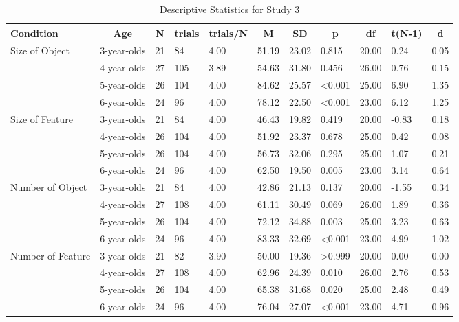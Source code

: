 \documentclass[
  man]{apa6}
\begin{document}
\begin{table}[tbp]

\begin{center}
\begin{threeparttable}

\caption{\label{tab:s3_testtables}Descriptive Statistics for Study 3}

\scriptsize{

\begin{tabular}{lllllllllll}
\toprule
Condition & \multicolumn{1}{c}{Age} & \multicolumn{1}{c}{N} & \multicolumn{1}{c}{trials} & \multicolumn{1}{c}{trials/N} & \multicolumn{1}{c}{M} & \multicolumn{1}{c}{SD} & \multicolumn{1}{c}{p} & \multicolumn{1}{c}{df} & \multicolumn{1}{c}{t(N-1)} & \multicolumn{1}{c}{d}\\
\midrule
Size of Object & 3-year-olds & 21 & 84 & 4.00 & 51.19 & 23.02 & 0.815 & 20.00 & 0.24 & 0.05\\
 & 4-year-olds & 27 & 105 & 3.89 & 54.63 & 31.80 & 0.456 & 26.00 & 0.76 & 0.15\\
 & 5-year-olds & 26 & 104 & 4.00 & 84.62 & 25.57 & <0.001 & 25.00 & 6.90 & 1.35\\
 & 6-year-olds & 24 & 96 & 4.00 & 78.12 & 22.50 & <0.001 & 23.00 & 6.12 & 1.25\\
Size of Feature & 3-year-olds & 21 & 84 & 4.00 & 46.43 & 19.82 & 0.419 & 20.00 & -0.83 & 0.18\\
 & 4-year-olds & 26 & 104 & 4.00 & 51.92 & 23.37 & 0.678 & 25.00 & 0.42 & 0.08\\
 & 5-year-olds & 26 & 104 & 4.00 & 56.73 & 32.06 & 0.295 & 25.00 & 1.07 & 0.21\\
 & 6-year-olds & 24 & 96 & 4.00 & 62.50 & 19.50 & 0.005 & 23.00 & 3.14 & 0.64\\
Number of Object & 3-year-olds & 21 & 84 & 4.00 & 42.86 & 21.13 & 0.137 & 20.00 & -1.55 & 0.34\\
 & 4-year-olds & 27 & 108 & 4.00 & 61.11 & 30.49 & 0.069 & 26.00 & 1.89 & 0.36\\
 & 5-year-olds & 26 & 104 & 4.00 & 72.12 & 34.88 & 0.003 & 25.00 & 3.23 & 0.63\\
 & 6-year-olds & 24 & 96 & 4.00 & 83.33 & 32.69 & <0.001 & 23.00 & 4.99 & 1.02\\
Number of Feature & 3-year-olds & 21 & 82 & 3.90 & 50.00 & 19.36 & >0.999 & 20.00 & 0.00 & 0.00\\
 & 4-year-olds & 27 & 108 & 4.00 & 62.96 & 24.39 & 0.010 & 26.00 & 2.76 & 0.53\\
 & 5-year-olds & 26 & 104 & 4.00 & 65.38 & 31.68 & 0.020 & 25.00 & 2.48 & 0.49\\
 & 6-year-olds & 24 & 96 & 4.00 & 76.04 & 27.07 & <0.001 & 23.00 & 4.71 & 0.96\\
\bottomrule
\end{tabular}

}

\end{threeparttable}
\end{center}

\end{table}
\end{document}
